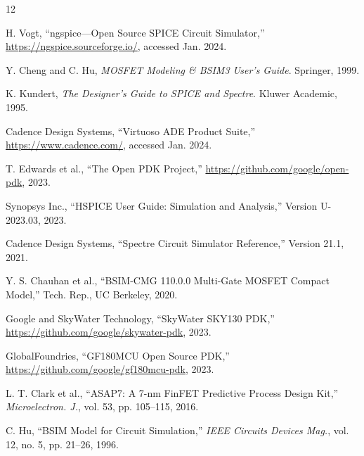 \documentclass[conference]{IEEEtran}
\begin{document}
\balance

\begin{thebibliography}{12}

H. Vogt, ``ngspice---Open Source SPICE Circuit Simulator,'' 
\url{https://ngspice.sourceforge.io/}, accessed Jan. 2024.

Y. Cheng and C. Hu, \textit{MOSFET Modeling \& BSIM3 User's Guide}. 
Springer, 1999.

K. Kundert, \textit{The Designer's Guide to SPICE and Spectre}.
Kluwer Academic, 1995.

Cadence Design Systems, ``Virtuoso ADE Product Suite,''
\url{https://www.cadence.com/}, accessed Jan. 2024.

T. Edwards et al., ``The Open PDK Project,''
\url{https://github.com/google/open-pdk}, 2023.

Synopsys Inc., ``HSPICE User Guide: Simulation and Analysis,''
Version U-2023.03, 2023.

Cadence Design Systems, ``Spectre Circuit Simulator Reference,''
Version 21.1, 2021.

Y. S. Chauhan et al., ``BSIM-CMG 110.0.0 Multi-Gate MOSFET Compact Model,''
Tech. Rep., UC Berkeley, 2020.

Google and SkyWater Technology, ``SkyWater SKY130 PDK,''
\url{https://github.com/google/skywater-pdk}, 2023.

GlobalFoundries, ``GF180MCU Open Source PDK,''
\url{https://github.com/google/gf180mcu-pdk}, 2023.

L. T. Clark et al., ``ASAP7: A 7-nm FinFET Predictive Process Design Kit,''
\textit{Microelectron. J.}, vol. 53, pp. 105--115, 2016.

C. Hu, ``BSIM Model for Circuit Simulation,'' 
\textit{IEEE Circuits Devices Mag.}, vol. 12, no. 5, pp. 21--26, 1996.

\end{thebibliography}
\end{document}

